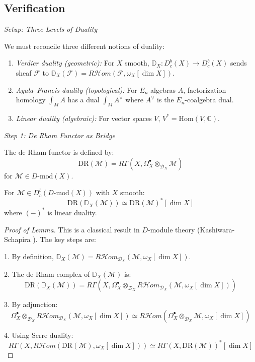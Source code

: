 \subsection{Verification}

\emph{Setup: Three Levels of Duality}

We must reconcile three different notions of duality:

\begin{enumerate}
\item \emph{Verdier duality (geometric):} For $X$ smooth, $\mathbb{D}_X: D^b_c(X)
\to D^b_c(X)$ sends sheaf $\mathcal{F}$ to $\mathbb{D}_X(\mathcal{F}) =
R\mathcal{H}om(\mathcal{F}, \omega_X[\dim X])$.

\item \emph{Ayala--Francis duality (topological):} For $E_n$-algebras $A$,
factorization homology $\int_M A$ has a dual $\int_M A^{\vee}$ where $A^{\vee}$
is the $E_n$-coalgebra dual.

\item \emph{Linear duality (algebraic):} For vector spaces $V$, $V^* =
\text{Hom}(V, \mathbb{C})$.
\end{enumerate}

\emph{Step 1: De Rham Functor as Bridge}

The de Rham functor is defined by:
\[\text{DR}(\mathcal{M}) = R\Gamma(X, \Omega^{\bullet}_X \otimes_{\mathcal{D}_X} \mathcal{M})\]
for $\mathcal{M} \in D\text{-mod}(X)$.

\begin{lemma}\label{lem:DR-verdier-compat}
For $\mathcal{M} \in D^b_c(D\text{-mod}(X))$ with $X$ smooth:
\[\text{DR}(\mathbb{D}_X(\mathcal{M})) \simeq \text{DR}(\mathcal{M})^* [\dim X]\]
where $(-)^*$ is linear duality.
\end{lemma}

\begin{proof}[Proof of Lemma]
This is a classical result in $D$-module theory (Kashiwara-Schapira \cite{KS90}).
The key steps are:

1. By definition, $\mathbb{D}_X(\mathcal{M}) = R\mathcal{H}om_{\mathcal{D}_X}(\mathcal{M},
\omega_X[\dim X])$.

2. The de Rham complex of $\mathbb{D}_X(\mathcal{M})$ is:
\[\text{DR}(\mathbb{D}_X(\mathcal{M})) = R\Gamma(X, \Omega^{\bullet}_X
\otimes_{\mathcal{D}_X} R\mathcal{H}om_{\mathcal{D}_X}(\mathcal{M}, \omega_X[\dim X]))\]

3. By adjunction:
\[\Omega^{\bullet}_X \otimes_{\mathcal{D}_X} R\mathcal{H}om_{\mathcal{D}_X}(\mathcal{M},
\omega_X[\dim X]) \simeq R\mathcal{H}om(\Omega^{\bullet}_X \otimes_{\mathcal{D}_X}
\mathcal{M}, \omega_X[\dim X])\]

4. Using Serre duality:
\[R\Gamma(X, R\mathcal{H}om(\text{DR}(\mathcal{M}), \omega_X[\dim X]))
\simeq R\Gamma(X, \text{DR}(\mathcal{M}))^* [\dim X]\]
\end{proof}

